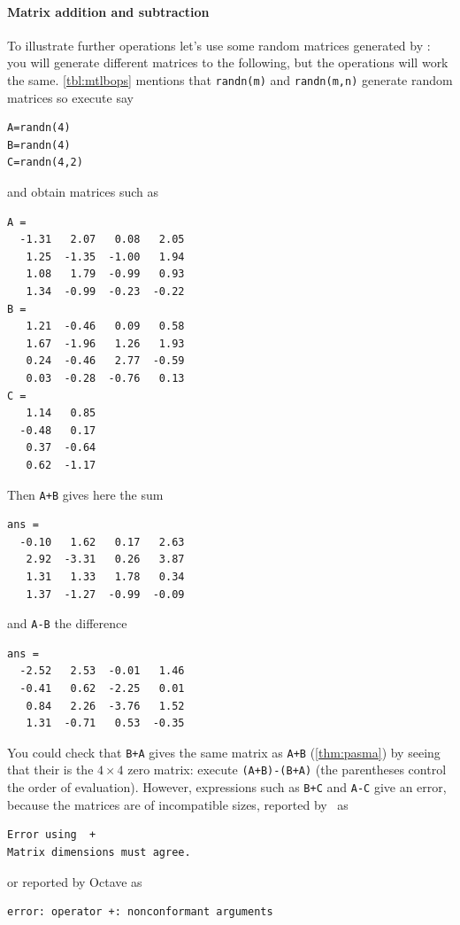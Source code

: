 \paragraph{Matrix addition and subtraction}
To illustrate further operations let's use some random matrices generated by \script: you will generate different matrices to the following, but the operations will work the same.
\autoref{tbl:mtlbops} mentions that \verb|randn(m)| and \verb|randn(m,n)| generate random matrices so execute say
\begin{verbatim}
A=randn(4)
B=randn(4)
C=randn(4,2)
\end{verbatim}
and obtain matrices such as \twodp
\setbox\ajrqrbox\hbox{}%
\marginajrbox%
\begin{verbatim}
A =
  -1.31   2.07   0.08   2.05
   1.25  -1.35  -1.00   1.94
   1.08   1.79  -0.99   0.93
   1.34  -0.99  -0.23  -0.22
B =
   1.21  -0.46   0.09   0.58
   1.67  -1.96   1.26   1.93
   0.24  -0.46   2.77  -0.59
   0.03  -0.28  -0.76   0.13
C =
   1.14   0.85
  -0.48   0.17
   0.37  -0.64
   0.62  -1.17
\end{verbatim}
Then \verb|A+B| gives here the sum
\begin{verbatim}
ans =
  -0.10   1.62   0.17   2.63
   2.92  -3.31   0.26   3.87
   1.31   1.33   1.78   0.34
   1.37  -1.27  -0.99  -0.09
\end{verbatim}
and \verb|A-B| the difference
\begin{verbatim}
ans =
  -2.52   2.53  -0.01   1.46
  -0.41   0.62  -2.25   0.01
   0.84   2.26  -3.76   1.52
   1.31  -0.71   0.53  -0.35
\end{verbatim}
You could check that \verb|B+A| gives the same matrix as \verb|A+B| (\autoref{thm:pasma}) by seeing that their  is the \(4\times4\) zero matrix: execute \verb|(A+B)-(B+A)| (the parentheses control the order of evaluation).
However, expressions such as \verb|B+C| and \verb|A-C| give an error, because the matrices are of incompatible sizes, reported by \script[1]\ as%
%
%
\begin{verbatim}
Error using  + 
Matrix dimensions must agree. 
\end{verbatim}
or reported by Octave as
\begin{verbatim}
error: operator +: nonconformant arguments 
\end{verbatim}


